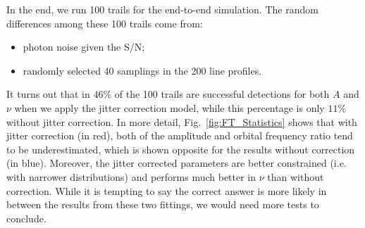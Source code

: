 In the end, we run 100 trails for the end-to-end simulation. The random differences among these 100 trails come from:
\begin{itemize}
	\item photon noise given the S/N;
	\item randomly selected 40 samplings in the 200 line profiles.
\end{itemize}
It turns out that in $46\%$ of the 100 trails are successful detections for both $A$ and $\nu$ when we 
apply the jitter correction model, while this percentage is only $11\%$ without jitter correction. 
In more detail, Fig.~\ref{fig:FT_Statistics} shows that with jitter correction (in red), both of the amplitude and 
orbital frequency ratio tend to be underestimated, which is shown opposite for the results without correction (in blue). 
Moreover, the jitter corrected parameters are better constrained (i.e. with narrower distributions) and 
performs much better in $\nu$ than without correction. While it is tempting to say the correct answer is more likely in between
the results from these two fittings, we would need more tests to conclude. 

